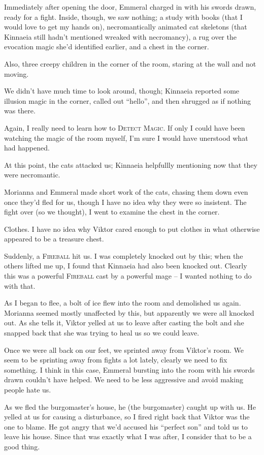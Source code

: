 Immediately after opening the door, Emmeral charged in with his swords drawn, ready for a fight. Inside, though, we saw nothing; a study with books (that I would love to get my hands on), necromantically animated cat skeletons (that Kinnaeia still hadn't mentioned wreaked with necromancy), a rug over the evocation magic she'd identified earlier, and a chest in the corner.

Also, three creepy children in the corner of the room, staring at the wall and not moving.

We didn't have much time to look around, though; Kinnaeia reported some illusion magic in the corner, called out ``hello'', and then shrugged as if nothing was there.

Again, I really need to learn how to \textsc{Detect Magic}. If only I could have been watching the magic of the room myself, I'm sure I would have unerstood what had happened.

At this point, the cats attacked us; Kinnaeia helpfullly mentioning now that they were necromantic.

Morianna and Emmeral made short work of the cats, chasing them down even once they'd fled for us, though I have no idea why they were so insistent. The fight over (so we thought), I went to examine the chest in the corner.

Clothes. I have no idea why Viktor cared enough to put clothes in what otherwise appeared to be a treasure chest.

Suddenly, a \textsc{Fireball} hit us. I was completely knocked out by this; when the others lifted me up, I found that Kinnaeia had also been knocked out. Clearly this was a powerful \textsc{Fireball} cast by a powerful mage -- I wanted nothing to do with that.

As I began to flee, a bolt of ice flew into the room and demolished us again. Morianna seemed mostly unaffected by this, but apparently we were all knocked out. As she tells it, Viktor yelled at us to leave after casting the bolt and she snapped back that she was trying to heal us so we could leave.

Once we were all back on our feet, we sprinted away from Viktor's room. We seem to be sprinting away from fights a lot lately, clearly we need to fix something. I think in this case, Emmeral bursting into the room with his swords drawn couldn't have helped. We need to be less aggressive and avoid making people hate us.

As we fled the burgomaster's house, he (the burgomaster) caught up with us. He yelled at us for causing a disturbance, so I fired right back that Viktor was the one to blame. He got angry that we'd accused his ``perfect son'' and told us to leave his house. Since that was exactly what I was after, I consider that to be a good thing.

